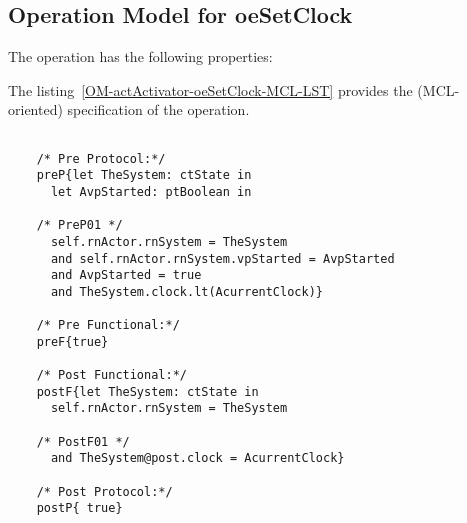 \subsection{Operation Model for oeSetClock}

\label{OM-oeSetClock}


The  operation has the following properties:

	\begin{operationmodel}



		


	\end{operationmodel}



	\vspace{1cm}
	The listing~\ref{OM-actActivator-oeSetClock-MCL-LST} provides the \msrmessir (MCL-oriented) specification of the operation.
	
	\scriptsize
	\vspace{0.5cm}
	\begin{lstlisting}[style=MessirStyle,firstnumber=auto,captionpos=b,caption={\msrmessir (MCL-oriented) specification of the operation \emph{oeSetClock}.},label=OM-actActivator-oeSetClock-MCL-LST]

	/* Pre Protocol:*/ 
	preP{let TheSystem: ctState in
	  let AvpStarted: ptBoolean in
	  
	/* PreP01 */
	  self.rnActor.rnSystem = TheSystem
	  and self.rnActor.rnSystem.vpStarted = AvpStarted
	  and AvpStarted = true
	  and TheSystem.clock.lt(AcurrentClock)}
	
	/* Pre Functional:*/
	preF{true}
	
	/* Post Functional:*/ 
	postF{let TheSystem: ctState in
	  self.rnActor.rnSystem = TheSystem
	
	/* PostF01 */
	  and TheSystem@post.clock = AcurrentClock}
	
	/* Post Protocol:*/ 
	postP{ true}
	
	\end{lstlisting}
	\normalsize 
	
	
	
	





